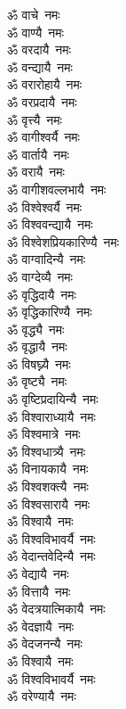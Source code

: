 \begin{flushleft}
\begin{multicols}{2}
ॐ वाचे~नमः\\
ॐ वाण्यै~नमः\\
ॐ वरदायै~नमः\\
ॐ वन्द्यायै~नमः\\
ॐ वरारोहायै~नमः\\
ॐ वरप्रदायै~नमः\\
ॐ वृत्त्यै~नमः\\
ॐ वागीश्वर्यै~नमः\\
ॐ वार्तायै~नमः\\
ॐ वरायै~नमः\hfill{}\\
ॐ वागीशवल्लभायै~नमः\\
ॐ विश्वेश्वर्यै~नमः\\
ॐ विश्ववन्द्यायै~नमः\\
ॐ विश्वेशप्रियकारिण्यै~नमः\\
ॐ वाग्वादिन्यै~नमः\\
ॐ वाग्देव्यै~नमः\\
ॐ वृद्धिदायै~नमः\\
ॐ वृद्धिकारिण्यै~नमः\\
ॐ वृद्ध्यै~नमः\\
ॐ वृद्धायै~नमः\hfill{}\\
ॐ विषघ्न्यै~नमः\\
ॐ वृष्ट्यै~नमः\\
ॐ वृष्टिप्रदायिन्यै~नमः\\
ॐ विश्वाराध्यायै~नमः\\
ॐ विश्वमात्रे~नमः\\
ॐ विश्वधात्र्यै~नमः\\
ॐ विनायकायै~नमः\\
ॐ विश्वशक्त्यै~नमः\\
ॐ विश्वसारायै~नमः\\
ॐ विश्वायै~नमः\hfill{}\\
ॐ विश्वविभावर्यै~नमः\\
ॐ वेदान्तवेदिन्यै~नमः\\
ॐ वेद्यायै~नमः\\
ॐ वित्तायै~नमः\\
ॐ वेदत्रयात्मिकायै~नमः\\
ॐ वेदज्ञायै~नमः\\
ॐ वेदजनन्यै~नमः\\
ॐ विश्वायै~नमः\\
ॐ विश्वविभावर्यै~नमः\\
ॐ वरेण्यायै~नमः\hfill{}\\

\end{multicols}
\end{flushleft}
